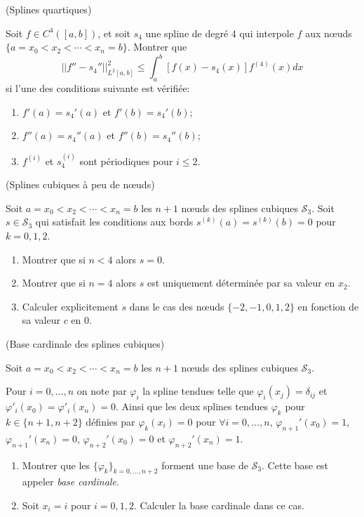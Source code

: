 \documentclass[a4paper,12pt,reqno]{amsart}
\begin{document}
\begin{exo} (Splines quartiques)

  Soit $f \in C^{4}([a,b])$, et soit $s_{4}$ une spline de degré $4$ qui interpole $f$ aux nœuds $\{a=x_{0}<x_{2}<\cdots<x_{n}=b\}$. Montrer que
      $$
        ||f''-s_{4}'' ||_{L^{2}[a,b]}^{2} \leq \int_{a}^{b} [f(x)-s_{4}(x)]f^{(4)}(x) dx
      $$
    si l'une des conditions suivante est vérifiée:
    \begin{enumerate}
      \item $f'(a)=s_{4}'(a)$ et $f'(b)=s_{4}'(b)$;
      \item $f''(a)=s_{4}''(a)$ et $f''(b)=s_{4}''(b)$;
      \item $f^{(i)}$ et $s_{4}^{(i)}$ sont périodiques pour $i \leq 2$.
    \end{enumerate}
\end{exo}

\begin{exo} (Splines cubiques à peu de nœuds)

  Soit $a=x_{0}<x_{2}<\cdots<x_{n}=b$ les $n+1$ nœuds des splines cubiques $\mathcal{S}_{3}$. Soit $s \in \mathcal{S}_{3}$ qui satisfait les conditions aux bords $s^{(k)}(a)=s^{(k)}(b)=0$ pour $k=0,1,2$.
  \begin{enumerate}
    \item Montrer que si $n < 4$ alors $s=0$.

    \item Montrer que si $n=4$ alors $s$ est uniquement déterminée par sa valeur en $x_{2}$.

    \item Calculer explicitement $s$ dans le cas des nœuds $\{-2,-1,0,1,2\}$ en fonction de sa valeur $c$ en $0$.
  \end{enumerate}

\end{exo}

\begin{exo} (Base cardinale des splines cubiques)

  Soit $a=x_{0}<x_{2}<\cdots<x_{n}=b$ les $n+1$ nœuds des splines cubiques $\mathcal{S}_{3}$.

  Pour $i=0,\ldots,n$ on note par $\varphi_{i}$ la spline tendues telle que $\varphi_{i}(x_{j})=\delta_{ij}$ et $\varphi'_{i}(x_{0})=\varphi'_{i}(x_{n})=0$. Ainsi que les deux splines tendues $\varphi_{k}$ pour $k \in \{n+1,n+2\}$ définies par $\varphi_{k}(x_{i})=0$ pour $\forall i=0,\ldots,n$, $\varphi_{n+1}'(x_{0})=1$, $\varphi_{n+1}'(x_{n})=0$, $\varphi_{n+2}'(x_{0})=0$ et $\varphi_{n+2}'(x_{n})=1$.
  \begin{enumerate}
    \item Montrer que les $\{\varphi_{k}\}_{k=0,\ldots,n+2}$ forment une base de $\mathcal{S}_{3}$.\newline
    Cette base est appeler \emph{base cardinale}.
    \item Soit $x_{i}=i$ pour $i=0,1,2$. Calculer la base cardinale dans ce cas.
  \end{enumerate}
\end{exo}
\end{document}
